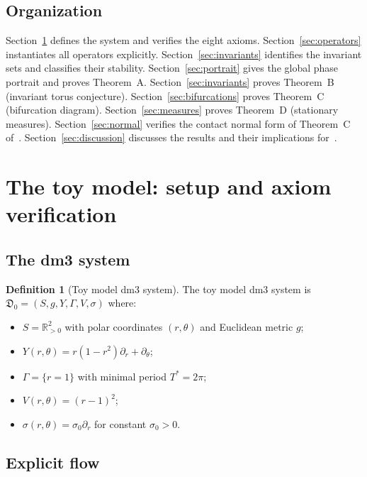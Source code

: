 \documentclass[12pt, oneside]{book}
\theoremstyle{plain}
\theoremstyle{definition}
\newtheorem{definition}{Definition}[section]
\theoremstyle{remark}
\newcommand{\R}{\mathbb{R}}
\newcommand{\dm}{\mathfrak{D}}
\newcommand{\Orb}{\Gamma}
\begin{document}
\subsection{Organization}

Section~\ref{sec:setup} defines the system and verifies the eight
axioms.
Section~\ref{sec:operators} instantiates all operators explicitly.
Section~\ref{sec:invariants} identifies the invariant sets and
classifies their stability.
Section~\ref{sec:portrait} gives the global phase portrait and
proves Theorem~A.
Section~\ref{sec:invariants} proves Theorem~B (invariant torus conjecture).
Section~\ref{sec:bifurcations} proves Theorem~C (bifurcation diagram).
Section~\ref{sec:measures} proves Theorem~D (stationary measures).
Section~\ref{sec:normal} verifies the contact normal form of
Theorem~C of~\cite{Paper1}.
Section~\ref{sec:discussion} discusses the results and their
implications for~\cite{Paper1}.

\section{The toy model: setup and axiom verification}\label{sec:setup}

\subsection{The dm3 system}

\begin{definition}[Toy model dm3 system]\label{def:toy}
The toy model dm3 system is
$\dm_0=(S,g,Y,\Orb,V,\sigma)$ where:
\begin{itemize}[leftmargin=*]
  \item $S=\R^2_{>0}$ with polar coordinates $(r,\theta)$ and
        Euclidean metric $g$;
  \item $Y(r,\theta)=r(1-r^2)\partial_r+\partial_\theta$;
  \item $\Orb=\{r=1\}$ with minimal period $T^*=2\pi$;
  \item $V(r,\theta)=(r-1)^2$;
  \item $\sigma(r,\theta)=\sigma_0\partial_r$ for constant $\sigma_0>0$.
\end{itemize}
\end{definition}

\subsection{Explicit flow}
\end{document}
